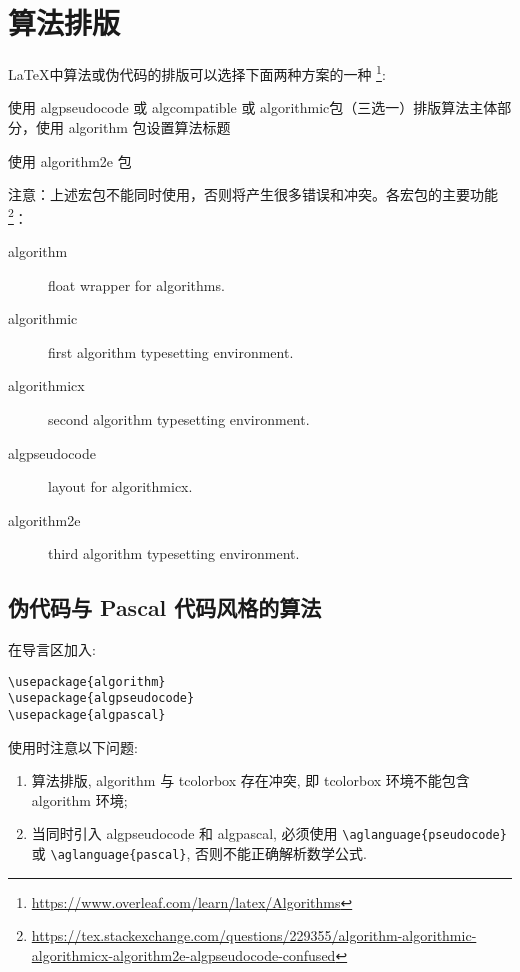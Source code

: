 \chapter{算法排版}

{\LaTeX}中算法或伪代码的排版可以选择下面两种方案的一种
\footnote{\url{https://www.overleaf.com/learn/latex/Algorithms}}:

\begin{compactitems}
  \item 使用 algpseudocode 或 algcompatible 或 algorithmic包（三选一）排版算法主体部分，使用 algorithm 包设置算法标题
  \item 使用 algorithm2e 包
\end{compactitems}

注意：上述宏包不能同时使用，否则将产生很多错误和冲突。各宏包的主要功能
\footnote{\url{https://tex.stackexchange.com/questions/229355/algorithm-algorithmic-algorithmicx-algorithm2e-algpseudocode-confused}}：
\begin{description}
  \item [algorithm] float wrapper for algorithms.
  \item [algorithmic] first algorithm typesetting environment.
  \item [algorithmicx] second algorithm typesetting environment.
  \item [algpseudocode] layout for algorithmicx.
  \item [algorithm2e] third algorithm typesetting environment.
\end{description}

\section{伪代码与 Pascal 代码风格的算法}

在导言区加入:
\begin{verbatim}
\usepackage{algorithm}
\usepackage{algpseudocode}
\usepackage{algpascal}
\end{verbatim}



\begin{remark*}
使用时注意以下问题:
\begin{enumerate}
  \item 算法排版, algorithm 与 tcolorbox 存在冲突, 即 {\ttfamily tcolorbox} 环境不能包含 {\ttfamily algorithm} 环境;
  \item 当同时引入 algpseudocode 和 algpascal, 必须使用 \verb|\aglanguage{pseudocode}| 或 
  \verb|\aglanguage{pascal}|, 否则不能正确解析数学公式.
\end{enumerate}
\end{remark*}

